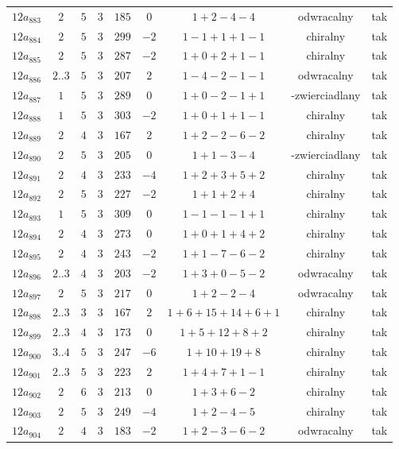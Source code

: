 \begin{longtable}{ccccccccc}
$12a_{883}$ & $2$ & $5$ & $3$ & $185$ & $0$ & $1+2-4-4$ & odwracalny & tak \\
$12a_{884}$ & $2$ & $5$ & $3$ & $299$ & $-2$ & $1-1+1+1-1$ & chiralny & tak \\
$12a_{885}$ & $2$ & $5$ & $3$ & $287$ & $-2$ & $1+0+2+1-1$ & chiralny & tak \\
$12a_{886}$ & $2..3$ & $5$ & $3$ & $207$ & $2$ & $1-4-2-1-1$ & odwracalny & tak \\
$12a_{887}$ & $1$ & $5$ & $3$ & $289$ & $0$ & $1+0-2-1+1$ & -zwierciadlany & tak \\
$12a_{888}$ & $1$ & $5$ & $3$ & $303$ & $-2$ & $1+0+1+1-1$ & chiralny & tak \\
$12a_{889}$ & $2$ & $4$ & $3$ & $167$ & $2$ & $1+2-2-6-2$ & chiralny & tak \\
$12a_{890}$ & $2$ & $5$ & $3$ & $205$ & $0$ & $1+1-3-4$ & -zwierciadlany & tak \\
$12a_{891}$ & $2$ & $4$ & $3$ & $233$ & $-4$ & $1+2+3+5+2$ & chiralny & tak \\
$12a_{892}$ & $2$ & $5$ & $3$ & $227$ & $-2$ & $1+1+2+4$ & chiralny & tak \\
$12a_{893}$ & $1$ & $5$ & $3$ & $309$ & $0$ & $1-1-1-1+1$ & chiralny & tak \\
$12a_{894}$ & $2$ & $4$ & $3$ & $273$ & $0$ & $1+0+1+4+2$ & chiralny & tak \\
$12a_{895}$ & $2$ & $4$ & $3$ & $243$ & $-2$ & $1+1-7-6-2$ & chiralny & tak \\
$12a_{896}$ & $2..3$ & $4$ & $3$ & $203$ & $-2$ & $1+3+0-5-2$ & odwracalny & tak \\
$12a_{897}$ & $2$ & $5$ & $3$ & $217$ & $0$ & $1+2-2-4$ & odwracalny & tak \\
$12a_{898}$ & $2..3$ & $3$ & $3$ & $167$ & $2$ & $1+6+15+14+6+1$ & chiralny & tak \\
$12a_{899}$ & $2..3$ & $4$ & $3$ & $173$ & $0$ & $1+5+12+8+2$ & chiralny & tak \\
$12a_{900}$ & $3..4$ & $5$ & $3$ & $247$ & $-6$ & $1+10+19+8$ & chiralny & tak \\
$12a_{901}$ & $2..3$ & $5$ & $3$ & $223$ & $2$ & $1+4+7+1-1$ & chiralny & tak \\
$12a_{902}$ & $2$ & $6$ & $3$ & $213$ & $0$ & $1+3+6-2$ & chiralny & tak \\
$12a_{903}$ & $2$ & $5$ & $3$ & $249$ & $-4$ & $1+2-4-5$ & chiralny & tak \\
$12a_{904}$ & $2$ & $4$ & $3$ & $183$ & $-2$ & $1+2-3-6-2$ & odwracalny & tak \\

\end{longtable}
